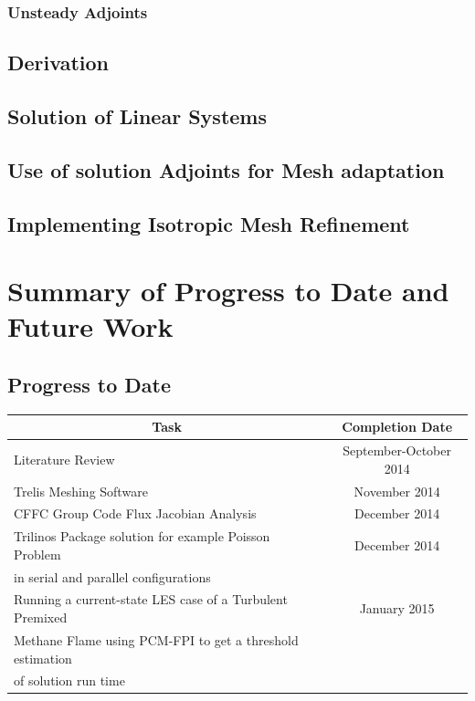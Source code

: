 \documentclass[titlepage,11pt,letterpaper]{article}
\begin{document}
\subsubsection{Unsteady Adjoints}
\subsection{Derivation}
\subsection{Solution of Linear Systems}
\subsection{Use of solution Adjoints for Mesh adaptation}
\subsection{Implementing Isotropic Mesh Refinement}

\newpage
\section{Summary of Progress to Date and Future Work}

\subsection{Progress to Date}

\begin{tabular}{|l|c|} \hline
\multicolumn{1}{|c|}{\bf{Task}} & \multicolumn{1}{|c|}{\bf{Completion Date}} \\

\hline Literature Review & September-October 2014 \\

\hline Trelis Meshing Software & November 2014 \\

\hline CFFC Group Code Flux Jacobian Analysis & December 2014 \\

\hline Trilinos Package solution for example Poisson Problem & December 2014 \\in serial and parallel configurations & \\

\hline Running a current-state LES case of a Turbulent Premixed & January 2015 \\Methane Flame using PCM-FPI to get a threshold estimation & \\ of solution run time\\

\hline
\end{tabular}
\end{document}
